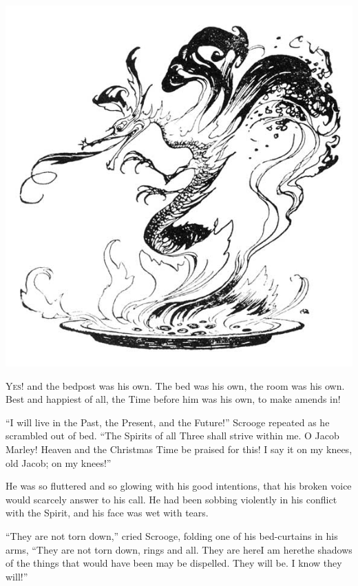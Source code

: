 \documentclass[paper=5.5in:8.5in,BCOR=10mm,twoside,DIV=15,12pt,usegeometry,openany]{scrbook} %
\begin{document}
\begin{minipage}[c]{\linewidth}
\includegraphics[width=\linewidth]{gs168}
\end{minipage}

\lettrine[loversize=.85]{Y}{es!} and the bedpost was his own. The bed was his own, the room was his own. Best and happiest of all, the Time before him was his own, to make amends in!

\enquote{I will live in the Past, the Present, and the Future!} Scrooge repeated as he scrambled out of bed. \enquote{The Spirits of all Three shall strive within me. O Jacob Marley! Heaven and the Christmas Time be praised for this! I say it on my knees, old Jacob; on my knees!}

He was so fluttered and so glowing with his good intentions, that his broken voice would scarcely answer to his call. He had been sobbing violently in his conflict with the Spirit, and his face was wet with tears.

\enquote{They are not torn down,} cried Scrooge, folding one of his bed-curtains in his arms, \enquote{They are not torn down, rings and all. They are here\textemdash I am here\textemdash the shadows of the things that would have been may be dispelled. They will be. I know they will!}
\end{document}
